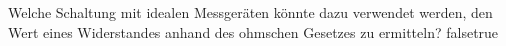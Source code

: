     {Welche Schaltung mit idealen Messgeräten könnte dazu verwendet werden, den Wert eines Widerstandes anhand des ohmschen Gesetzes zu ermitteln?}
    {}
    {}
    {}
    {}
    {false}{true}